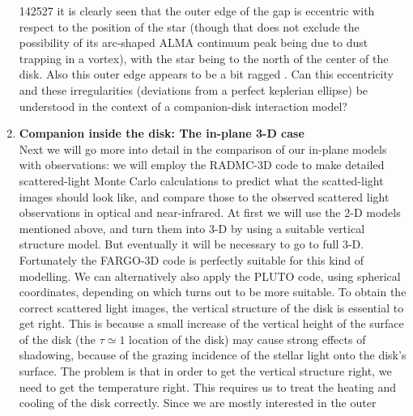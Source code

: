 \documentclass[10pt,fleqn,twoside]{article}
\begin{document}
\begin{enumerate}
  142527 \citep{2014ApJ...791L..37R} it is clearly seen that the outer edge
  of the gap is eccentric with respect to the position of the star (though
  that does not exclude the possibility of its arc-shaped ALMA continuum
  peak being due to dust trapping in a vortex), with the star being to the
  north of the center of the disk. Also this outer edge appears to be a bit
  ragged \citep[also seen in an earlier image
  by][]{2012A&A...546A..24R}. Can this eccentricity and these irregularities
  (deviations from a perfect keplerian ellipse) be understood in the context
  of a companion-disk interaction model? 
\item {\bf Companion inside the disk: The in-plane 3-D case}\\
  Next we will go more into detail in the comparison of our in-plane models
  with observations: we will employ the RADMC-3D code to make detailed
  scattered-light Monte Carlo calculations to predict what the scatted-light
  images should look like, and compare those to the observed scattered light
  observations in optical and near-infrared.  At first we will use the 2-D
  models mentioned above, and turn them into 3-D by using a suitable
  vertical structure model. But eventually it will be necessary to go to
  full 3-D. Fortunately the FARGO-3D code is perfectly suitable for this
  kind of modelling. We can alternatively also apply the PLUTO code, using
  spherical coordinates, depending on which turns out to be more suitable.
  To obtain the correct scattered light images, the vertical structure of
  the disk is essential to get right. This is because a small increase of
  the vertical height of the surface of the disk (the $\tau\simeq 1$
  location of the disk) may cause strong effects of shadowing, because of
  the grazing incidence of the stellar light onto the disk's surface. The
  problem is that in order to get the vertical structure right, we need to
  get the temperature right. This requires us to treat the heating and
  cooling of the disk correctly. Since we are mostly interested in the outer

\end{enumerate}
\end{document}
